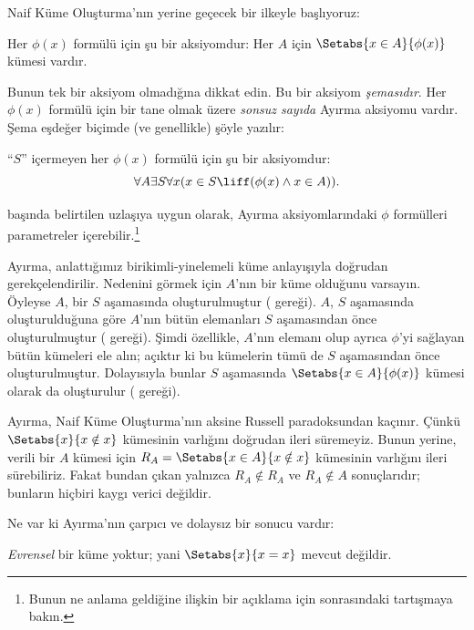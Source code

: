 \documentclass[../../../include/open-logic-section]{subfiles}
\begin{document}

Naif Küme Oluşturma'nın yerine geçecek bir ilkeyle başlıyoruz:

\begin{axiom} Her $\phi(x)$ formülü için şu bir
aksiyomdur: Her $A$ için $\Setabs{x \in A}{\phi(x)}$ kümesi vardır.
\end{axiom}

Bunun tek bir aksiyom olmadığına dikkat edin. Bu bir aksiyom
\emph{şemasıdır}. Her $\phi(x)$ formülü için bir tane olmak üzere
\emph{sonsuz sayıda} Ayırma aksiyomu vardır. Şema eşdeğer biçimde
(ve genellikle) şöyle yazılır:

\begin{defish}
``$S$'' içermeyen her $\phi(x)$ formülü için şu bir aksiyomdur:
\[
	\forall A \exists S \forall x(x \in S \liff (\phi(x) \land x \in A)).
\]
\end{defish}

 başında belirtilen uzlaşıya uygun olarak,
Ayırma aksiyomlarındaki $\phi$ formülleri parametreler
içerebilir.\footnote{Bunun ne anlama geldiğine ilişkin bir açıklama için
 sonrasındaki
tartışmaya bakın.}

Ayırma, anlattığımız birikimli-yinelemeli küme anlayışıyla doğrudan
gerekçelendirilir. Nedenini görmek için $A$'nın bir küme olduğunu varsayın.
Öyleyse $A$, bir $S$ aşamasında oluşturulmuştur (\stageshier{} gereği).
$A$, $S$ aşamasında oluşturulduğuna göre $A$'nın bütün elemanları $S$
aşamasından önce oluşturulmuştur (\stagesacc{} gereği). Şimdi özellikle,
$A$'nın elemanı olup ayrıca $\phi$'yi sağlayan bütün kümeleri ele alın;
açıktır ki bu kümelerin tümü de $S$ aşamasından önce oluşturulmuştur.
Dolayısıyla bunlar $S$ aşamasında $\Setabs{x \in A}{\phi(x)}$ kümesi
olarak da oluşturulur (\stagesacc{} gereği).

Ayırma, Naif Küme Oluşturma'nın aksine Russell paradoksundan kaçınır.
Çünkü $\Setabs{x}{x \notin x}$ kümesinin varlığını doğrudan ileri
süremeyiz. Bunun yerine, verili bir $A$ kümesi için
$R_A = \Setabs{x \in A}{x \notin x}$ kümesinin varlığını ileri sürebiliriz.
Fakat bundan çıkan yalnızca $R_A \notin R_A$ ve $R_A \notin A$ sonuçlarıdır;
bunların hiçbiri kaygı verici değildir.

Ne var ki Ayırma'nın çarpıcı ve dolaysız bir sonucu vardır:

\begin{thm}
\emph{Evrensel} bir küme yoktur; yani $\Setabs{x}{x = x}$ mevcut değildir.
\end{thm}
\end{document}
